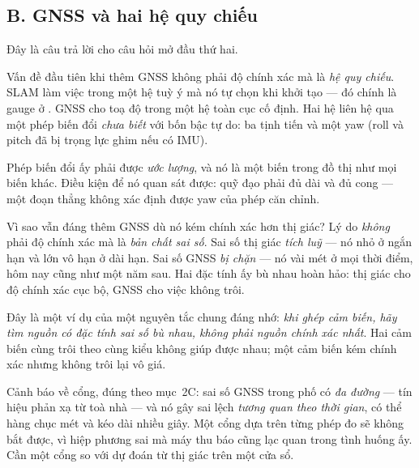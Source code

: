 \documentclass[../../vslam.tex]{subfiles}
\begin{document}
\subsection{B. GNSS và hai hệ quy chiếu}

Đây là câu trả lời cho câu hỏi mở đầu thứ hai.

Vấn đề đầu tiên khi thêm GNSS không phải độ chính xác mà là \emph{hệ quy chiếu}. SLAM làm việc trong một hệ tuỳ ý mà nó tự chọn khi khởi tạo --- đó chính là gauge ở . GNSS cho toạ độ trong một hệ toàn cục cố định. Hai hệ liên hệ qua một phép biến đổi \emph{chưa biết} với bốn bậc tự do: ba tịnh tiến và một yaw (roll và pitch đã bị trọng lực ghim nếu có IMU).

Phép biến đổi ấy phải được \emph{ước lượng}, và nó là một biến trong đồ thị như mọi biến khác. Điều kiện để nó quan sát được: quỹ đạo phải đủ dài và đủ cong --- một đoạn thẳng không xác định được yaw của phép căn chỉnh.

Vì sao vẫn đáng thêm GNSS dù nó kém chính xác hơn thị giác? Lý do \emph{không} phải độ chính xác mà là \emph{bản chất sai số}. Sai số thị giác \emph{tích luỹ} --- nó nhỏ ở ngắn hạn và lớn vô hạn ở dài hạn. Sai số GNSS \emph{bị chặn} --- nó vài mét ở mọi thời điểm, hôm nay cũng như một năm sau. Hai đặc tính ấy bù nhau hoàn hảo: thị giác cho độ chính xác cục bộ, GNSS cho việc không trôi.

Đây là một ví dụ của một nguyên tắc chung đáng nhớ: \emph{khi ghép cảm biến, hãy tìm nguồn có đặc tính sai số bù nhau, không phải nguồn chính xác nhất}. Hai cảm biến cùng trôi theo cùng kiểu không giúp được nhau; một cảm biến kém chính xác nhưng không trôi lại vô giá.

Cảnh báo về cổng, đúng theo mục~2C: sai số GNSS trong phố có \emph{đa đường} --- tín hiệu phản xạ từ toà nhà --- và nó gây sai lệch \emph{tương quan theo thời gian}, có thể hàng chục mét và kéo dài nhiều giây. Một cổng dựa trên từng phép đo sẽ không bắt được, vì hiệp phương sai mà máy thu báo cũng lạc quan trong tình huống ấy. Cần một cổng so với dự đoán từ thị giác trên một cửa sổ.
\end{document}
